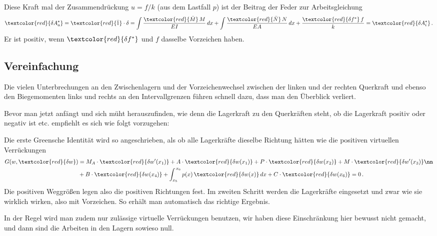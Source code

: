 Diese Kraft mal der Zusammendr\"{u}ckung $u = f/k$ (aus dem Lastfall $p$) ist der Beitrag der Feder zur Arbeitsgleichung
\begin{align}
\textcolor{red}{\delta A_a^*} = \textcolor{red}{\bar{1}} \cdot \delta  = \int \frac{\textcolor{red}{\bar{M}}\,M}{EI}\,dx + \int \frac{\textcolor{red}{\bar{N}}\,N}{EA}\,dx + \frac{\textcolor{red}{\delta f^*} \,f}{k}= \textcolor{red}{\delta A_i^*}\,.
\end{align}
Er ist positiv, wenn $\textcolor{red}{\delta f^*} $ und $f $ dasselbe Vorzeichen haben.
\\

{\textcolor{blau2}{\section{Vereinfachung}}}
Die vielen Unterbrechungen an den Zwischenlagern und der Vorzeichenwechsel zwischen der linken und der rechten Querkraft und ebenso den Biegemomenten links und rechts an den Intervallgrenzen f\"{u}hren schnell dazu, dass man den \"{U}berblick verliert.

Bevor man jetzt anf\"{a}ngt und sich m\"{u}ht herauszufinden, wie denn die Lagerkraft zu den Querkr\"{a}ften steht, ob die Lagerkraft positiv oder negativ ist etc. empfiehlt es sich wie folgt vorzugehen:

Die erste Greensche Identit\"{a}t wird so angeschrieben, als ob alle Lagerkr\"{a}fte dieselbe Richtung h\"{a}tten wie die positiven virtuellen Verr\"{u}ckungen
\begin{align}
G(w, \textcolor{red}{\delta w}) &= M_A \cdot \textcolor{red}{\delta w'(x_1)} + A\cdot \textcolor{red}{\delta w(x_1)} + P\cdot \textcolor{red}{\delta w(x_2)} + M \cdot \textcolor{red}{\delta w'(x_3)}\nn \\
&+ B \cdot \textcolor{red}{\delta w(x_4)} + \int_{x_5}^{\,x_6} p(x)\,\textcolor{red}{\delta w(x)}\,dx + C\cdot\textcolor{red}{\delta w(x_6)} = 0\,.
\end{align}
Die positiven Weggr\"{o}{\ss}en legen also die positiven Richtungen fest. Im zweiten Schritt werden die Lagerkr\"{a}fte eingesetzt und zwar wie sie wirklich wirken, also mit Vorzeichen.
So erh\"{a}lt man automatisch das richtige Ergebnis.

In der Regel wird man zudem nur zul\"{a}ssige virtuelle Verr\"{u}ckungen benutzen, wir haben diese Einschr\"{a}nkung hier
bewusst nicht gemacht, und dann sind die Arbeiten in den Lagern sowieso null.\\


